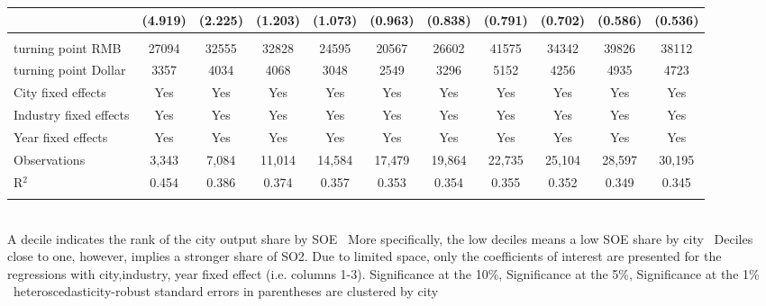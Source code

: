 \documentclass[12pt]{article}
\begin{document}
\begin{table}[!htbp]
\begin{adjustbox}{width=\textwidth, totalheight=\baselineskip,keepaspectratio}
\begin{tabular}{@{\extracolsep{5pt}}lcccccccccc}
  & (4.919) & (2.225) & (1.203) & (1.073) & (0.963) & (0.838) & (0.791) & (0.702) & (0.586) & (0.536) \\ 
 \hline \\[-1.8ex] 
turning point RMB & 27094 & 32555 & 32828 & 24595 & 20567 & 26602 & 41575 & 34342 & 39826 & 38112 \\ 
turning point Dollar & 3357 & 4034 & 4068 & 3048 & 2549 & 3296 & 5152 & 4256 & 4935 & 4723 \\ 
City fixed effects & Yes & Yes & Yes & Yes & Yes & Yes & Yes & Yes & Yes & Yes \\ 
Industry fixed effects & Yes & Yes & Yes & Yes & Yes & Yes & Yes & Yes & Yes & Yes \\ 
Year fixed effects & Yes & Yes & Yes & Yes & Yes & Yes & Yes & Yes & Yes & Yes \\ 
Observations & 3,343 & 7,084 & 11,014 & 14,584 & 17,479 & 19,864 & 22,735 & 25,104 & 28,597 & 30,195 \\ 
R$^{2}$ & 0.454 & 0.386 & 0.374 & 0.357 & 0.353 & 0.354 & 0.355 & 0.352 & 0.349 & 0.345 \\ 
\hline 
\hline \\[-1.8ex] 
\end{tabular}
\end{adjustbox}
\begin{tablenotes} 
 \small 
 \item \\ 
\footnotesize{
A decile indicates the rank of the city output share by SOE \
More specifically, the low deciles means a low SOE share by city \
Deciles close to one, however, implies a stronger share of SO2.
Due to limited space, only the coefficients of interest are presented 
for the regressions with city,industry, year fixed effect (i.e. columns 1-3).
\sym{*} Significance at the 10\%, \sym{**} Significance at the 5\%, \sym{***} Significance at the 1\% \
heteroscedasticity-robust standard errors in parentheses are clustered by city 
}
 
\end{tablenotes}
\end{table}
\end{document}
